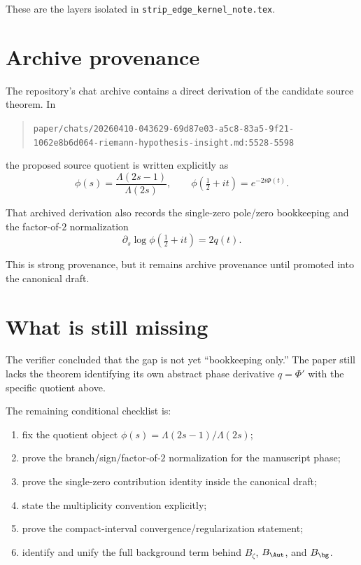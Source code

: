 \documentclass[11pt]{article}
\begin{document}
These are the layers isolated in \texttt{strip_edge_kernel_note.tex}.

\section{Archive provenance}

The repository's chat archive contains a direct derivation of the candidate
source theorem. In

\begin{quote}
\texttt{paper/chats/20260410-043629-69d87e03-a5c8-83a5-9f21-1062e8b6d064-riemann-hypothesis-insight.md:5528-5598}
\end{quote}

the proposed source quotient is written explicitly as
\[
\phi(s)=\frac{\Lambda(2s-1)}{\Lambda(2s)},
\qquad
\phi\!\left(\tfrac12+it\right)=e^{-2i\Phi(t)}.
\]

That archived derivation also records the single-zero pole/zero bookkeeping and
the factor-of-\(2\) normalization
\[
\partial_s\log\phi\!\left(\tfrac12+it\right)=2q(t).
\]

This is strong provenance, but it remains archive provenance until promoted into
the canonical draft.

\section{What is still missing}

The verifier concluded that the gap is not yet ``bookkeeping only.'' The paper
still lacks the theorem identifying its own abstract phase derivative
\(q=\Phi'\) with the specific quotient above.

The remaining conditional checklist is:

\begin{enumerate}
\item fix the quotient object \(\phi(s)=\Lambda(2s-1)/\Lambda(2s)\);
\item prove the branch/sign/factor-of-\(2\) normalization for the manuscript
phase;
\item prove the single-zero contribution identity inside the canonical draft;
\item state the multiplicity convention explicitly;
\item prove the compact-interval convergence/regularization statement;
\item identify and unify the full background term behind \(B_\zeta\),
\(B_{\Aut}\), and \(B_{\bg}\).
\end{enumerate}
\end{document}
